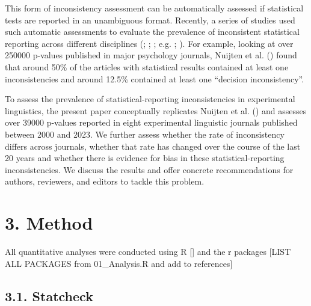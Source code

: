 \documentclass[
  doc,
  longtable,
  nolmodern,
  notxfonts,
  notimes,
  colorlinks=true,linkcolor=blue,citecolor=blue,urlcolor=blue]{apa7}
\begin{document}
This form of inconsistency assessment can be automatically assessed if
statistical tests are reported in an unambiguous format. Recently, a
series of studies used such automatic assessments to evaluate the
prevalence of inconsistent statistical reporting across different
disciplines (;
;
; e.g.
;
). For
example, looking at over 250000 p-values published in major psychology
journals, Nuijten et al. ()
found that around 50\% of the articles with statistical results
contained at least one inconsistencies and around 12.5\% contained at
least one ``decision inconsistency''.

To assess the prevalence of statistical-reporting inconsistencies in
experimental linguistics, the present paper conceptually replicates
Nuijten et al. () and assesses
over 39000 p-values reported in eight experimental linguistic journals
published between 2000 and 2023. We further assess whether the rate of
inconsistency differs across journals, whether that rate has changed
over the course of the last 20 years and whether there is evidence for
bias in these statistical-reporting inconsistencies. We discuss the
results and offer concrete recommendations for authors, reviewers, and
editors to tackle this problem.

\section{3. Method}\label{method}

All quantitative analyses were conducted using R {[}{]} and the r
packages {[}LIST ALL PACKAGES from 01\_Analysis.R and add to
references{]}

\subsection{3.1. Statcheck}\label{statcheck}
\end{document}
